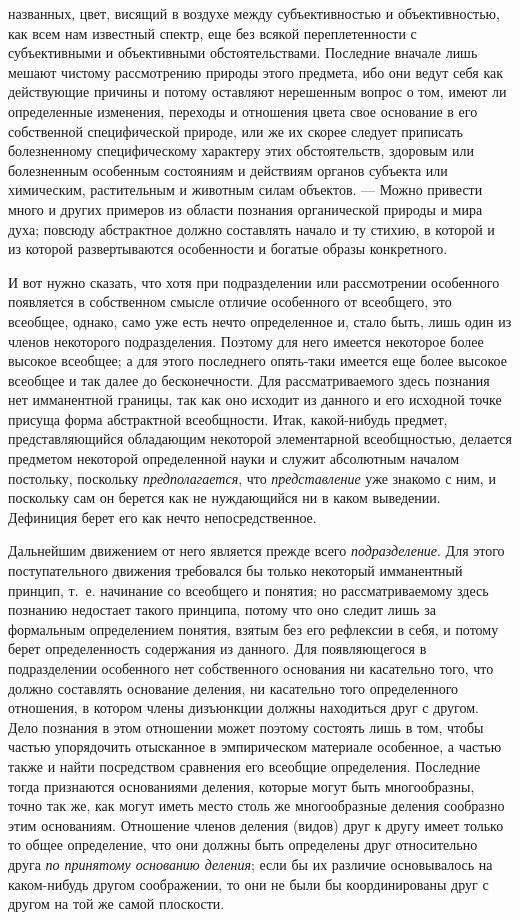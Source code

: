\documentclass[twoside]{article}
\begin{document}
названных, цвет, висящий в воздухе между субъективностью и объективностью,
как всем нам известный спектр, еще без всякой переплетенности с
субъективными и объективными обстоятельствами. Последние вначале лишь
мешают чистому рассмотрению природы этого предмета, ибо они ведут себя как
действующие причины и потому оставляют нерешенным вопрос о том, имеют ли
определенные изменения, переходы и отношения цвета свое основание в его
собственной специфической природе, или же их скорее следует приписать
болезненному специфическому характеру этих обстоятельств, здоровым или
болезненным особенным состояниям и действиям органов субъекта или
химическим, растительным и животным силам объектов. — Можно
привести много и других примеров из области познания органической природы и
мира духа; повсюду абстрактное должно составлять начало и ту стихию, в
которой и из которой развертываются особенности и богатые образы
конкретного.

И вот нужно сказать, что хотя при подразделении или
рассмотрении особенного появляется в собственном смысле отличие особенного
от всеобщего, это всеобщее, однако, само уже есть нечто определенное и,
стало быть, лишь один из членов некоторого подразделения. Поэтому для него
имеется некоторое более высокое всеобщее; а для этого последнего опять-таки
имеется еще более высокое всеобщее и так далее до
бесконечности. Для рассматриваемого здесь познания нет имманентной границы,
так как оно исходит из данного и его исходной точке присуща форма
абстрактной всеобщности. Итак, какой-нибудь предмет, представляющийся
обладающим некоторой элементарной всеобщностью, делается предметом
некоторой определенной науки и служит абсолютным началом постольку,
поскольку {\em предполагается},
что {\em представление}
уже знакомо с ним, и поскольку сам он берется как не
нуждающийся ни в каком выведении. Дефиниция берет его как нечто
непосредственное.

Дальнейшим движением от него является прежде всего
{\em подразделение}. Для
этого поступательного движения требовался бы только некоторый имманентный
принцип, т.~е. начинание со всеобщего и понятия; но рассматриваемому здесь
познанию недостает такого принципа, потому что оно следит лишь за
формальным определением понятия, взятым без его рефлексии в себя, и потому
берет определенность содержания из данного. Для появляющегося в
подразделении особенного нет собственного основания ни касательно того, что
должно составлять основание деления, ни касательно того определенного
отношения, в котором члены дизъюнкции должны находиться друг с другом. Дело
познания в этом отношении может поэтому состоять лишь в том, чтобы частью
упорядочить отысканное в эмпирическом материале особенное, а частью также и
найти посредством сравнения его всеобщие определения. Последние тогда
признаются основаниями деления, которые могут быть многообразны, точно так
же, как могут иметь место столь же многообразные деления сообразно этим
основаниям. Отношение членов деления (видов) друг к другу имеет только то
общее определение, что они должны быть определены друг относительно друга
{\em по принятому основанию деления};
если бы их различие основывалось на каком-нибудь другом
соображении, то они не были бы координированы друг с другом на той же самой
плоскости.
\end{document}
